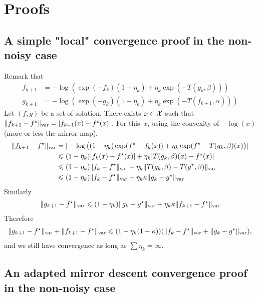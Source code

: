 \documentclass[a4paper, 10pt]{article}
\begin{document}
\section{Proofs}

\subsection{A simple "local" convergence proof in the non-noisy case}
Remark that 
\begin{align}
    f_{k+1} &=  - \log (\exp(-f_k) (1 - \eta_k) + \eta_k \exp(-T(g_k, \beta))) \\ 
    g_{k+1} &=  - \log (\exp(-g_k) (1 - \eta_k) + \eta_k \exp(-T(f_{k+1}, \alpha)))
\end{align}
Let $(f, g)$ be a set of solution. There exists $x \in \mathcal{X}$ such that $\Vert
f_{k+1} - f^\star \Vert_{\text{var}} = |f_{k+1}(x) - f^\star(x)|$. For this~$x$, using
the convexity of $- \log(x)$ (more or less the mirror map),
\begin{align}
    \Vert f_{k+1} - f^\star \Vert_{\text{var}}
    &=
     |- \log\big((1 - \eta_k) \exp(f^\star -f_k(x)) 
     + \eta_k \exp(f^\star-T(g_k, \beta)(x)\big) |  \\
    &\leqslant (1 - \eta_k) | f_k(x) - f^\star(x)| + \eta_k | T(g_k,\beta)(x) - f^\star(x)| \\
    &\leqslant (1 - \eta_k) \Vert f_k - f^\star \Vert_{\text{var}} + \eta_k
    \Vert T(g_k,\beta) - T(g^\star, \beta) \Vert_{\text{var}} \\
    &\leqslant (1 - \eta_k) \Vert f_k - f^\star \Vert_{\text{var}}
     + \eta_k \kappa \Vert g_k - g^\star \Vert_{\text{var}}
\end{align}
Similarly
\begin{align}
    \Vert g_{k+1} - f^\star \Vert_{\text{var}} \leqslant
    (1 - \eta_k) \Vert g_k - g^\star \Vert_{\text{var}} +
     \eta_k \kappa \Vert f_{k+1} - f^\star \Vert_{\text{var}}
\end{align}
Therefore
\begin{align}
    \Vert g_{k+1} - f^\star \Vert_{\text{var}} + \Vert f_{k+1} - f^\star \Vert_{\text{var}} \leqslant
    (1 - \eta_k ( 1 - \kappa)) ( \Vert f_k - f^\star \Vert_{\text{var}} 
     + \Vert g_k - g^\star \Vert_{\text{var}} ),
\end{align}
and we still have convergence as long as $\sum \eta_k = \infty$.

\subsection{An adapted mirror descent convergence proof in the non-noisy case}
\end{document}
